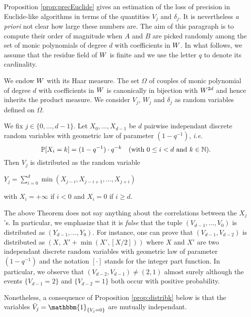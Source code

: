 \documentclass{article}
\begin{document}
Proposition \ref{prop:precEuclide} gives an estimation of the loss
of precision in Euclide-like algorithms in terms of the quantities
$V_j$ and $\delta_j$. It is nevertheless \emph{a priori} not clear
how large these numbers are. The aim of this paragraph is to compute
their order of magnitude when $A$ and $B$ are picked randomly among
the set of monic polynomials of degree $d$ with coefficients in $W$.
In what follows, we assume that the residue field of $W$ is finite
and we use the letter $q$ to denote its cardinality.

We endow $W$ with its Haar measure. The set $\Omega$ of couples of 
monic polynomial of degree $d$ with coefficients in $W$ is canonically 
in bijection with $W^{2d}$ and hence inherits the product measure. 
We consider $V_j$, $W_j$ and $\delta_j$ as random variables defined on 
$\Omega$.

\begin{theo}
\label{th:lawVj}
We fix $j \in \{0, \ldots, d-1\}$.
Let $X_0, \ldots, X_{d-1}$ be $d$ pairwise independant discrete random 
variables with geometric law of parameter $(1 - q^{-1})$, \emph{i.e.}
$$\mathbb P[X_i = k] = (1 - q^{-1}) \cdot q^{-k} \quad 
\text{(with } 0 \leq i < d \text{ and } k \in \mathbb N \text{)}.$$
Then $V_j$ is distributed as the random variable
\begin{center}
$\displaystyle Y_j = \sum_{i=0}^d \min(X_{j-i}, X_{j-i+1}, \ldots, X_{j+i})$
\end{center}
\noindent
with $X_i = +\infty$ if $i < 0$ and $X_i = 0$ if $i \geq d$.
\end{theo}

\begin{rem}
The above Theorem does not say anything about the correlations between
the $X_j$'s. In particular, we emphasize that it is \emph{false} that
the tuple $(V_{d-1}, \ldots, V_0)$ is distributed as $(Y_{d-1}, \ldots,
Y_0)$. For instance, one can prove that $(V_{d-1}, 
V_{d-2})$ is distributed as 
$(X, \, X' + \min(X', [X/2]))$
where $X$ and $X'$ are two independant discrete random variables with 
geometric law of parameter $(1 - q^{-1})$ and the notation $[\cdot]$ 
stands for the integer part function. In particular, we observe that 
$(V_{d-2}, V_{d-1}) \neq (2,1)$ almost surely although the events 
$\{V_{d-1} = 2\}$ and $\{V_{d-2} = 1\}$ both occur with positive 
probability.

Nonetheless, a consequence of Proposition \ref{prop:distribk} below is 
that the variables $\bar V_j = \mathbbm{1}_{\{V_j = 0\}}$ are mutually 
independant.
\end{rem}
\end{document}
